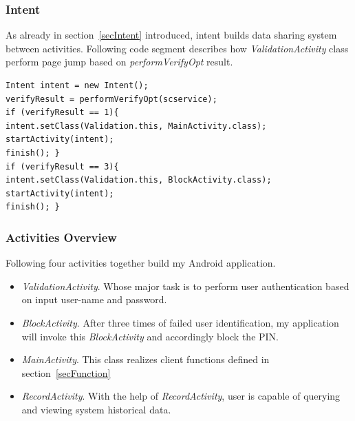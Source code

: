 \subsubsection{Intent}
As already in section~\ref{secIntent} introduced, intent builds data sharing system between activities. Following code segment describes how \emph{ValidationActivity} class perform page jump based on \emph{performVerifyOpt} result.
\begin{Verbatim}[fontsize=\relsize{-1},frame=lines,framesep=4mm, label=\fbox{\small\emph{Intent}}]
Intent intent = new Intent();           			  	
verifyResult = performVerifyOpt(scservice);
if (verifyResult == 1){
intent.setClass(Validation.this, MainActivity.class);  
startActivity(intent);  
finish(); }
if (verifyResult == 3){
intent.setClass(Validation.this, BlockActivity.class);  
startActivity(intent);  
finish(); }
\end{Verbatim}
\subsubsection{Activities Overview}
Following four activities together build my Android application.
\begin{itemize}
\item \emph{ValidationActivity}. Whose major task is to perform user authentication based on input user-name and password.
\item \emph{BlockActivity}. After three times of failed user identification, my application will invoke this \emph{BlockActivity} and accordingly block the PIN.
\item \emph{MainActivity}. This class realizes client functions defined in section~\ref{secFunction}
\item \emph{RecordActivity}. With the help of \emph{RecordActivity}, user is capable of querying and viewing system historical data.
\end{itemize}

